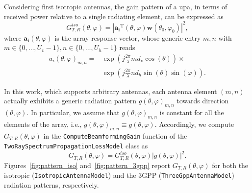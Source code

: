 Considering first isotropic antennas, the gain pattern of a \gls{upa}, in terms of received power relative to a single radiating element, can be expressed as~\cite{ASPLUND202089}
\begin{equation}
  G_{T, R}^{iso}(\theta, \varphi) = \left| \bm{a_i}^{\mathrm{T}}(\theta, \varphi)  \bm{w}\left(\theta_0, \varphi_0\right) \right|^2,
\end{equation}
where $\bm{a_i}(\theta, \varphi)$ is the array response vector, whose generic entry $m,n$ with $m \in \{0, \ldots, U_v - 1 \}, n \in \{0, \ldots, U_h - 1 \}$ reads
\begin{align}
  a_i (\theta, \varphi)_{m, n} = & \exp \left( j\frac{2\pi}{\lambda}m d_v \cos(\theta) \right) \times \\
    & \exp\left( j \frac{2\pi}{\lambda} n d_h \sin(\theta)\sin(\varphi) \right). \nonumber
\end{align} 

In this work, which supports arbitrary antennas, each antenna element $(m, n)$ actually exhibits a generic radiation pattern $g(\theta, \varphi)_{m, n}$ towards direction $(\theta, \varphi)$. In particular, we assume that $g(\theta, \varphi)_{m, n}$ is constant for all the elements of the array, i.e., $g(\theta, \varphi)_{m, n} \equiv g(\theta, \varphi)$. 
Accordingly, we compute $G_{T, R}(\theta, \varphi)$ in the \texttt{Compute\-Beamforming\-Gain} function of the \texttt{Two\-Ray\-Spectrum\-Propagation\-Loss\-Model} class as
\begin{equation}
  G_{T, R}(\theta, \varphi) =  G_{T, R}^{iso}(\theta, \varphi) \left| g(\theta, \varphi) \right|^2.
\end{equation}
%
Figures~\ref{fig:pattern_iso} and~\ref{fig:pattern_3gpp} report $G_{T, R} (\theta, \varphi)$ for both the isotropic (\texttt{Isotropic\-Antenna\-Model}) and the 3GPP (\texttt{ThreeGpp\-Antenna\-Model}) radiation patterns, respectively. 

